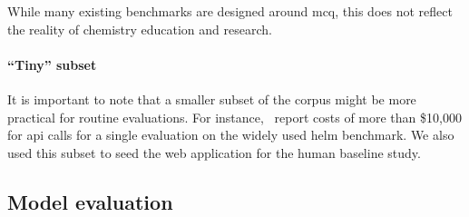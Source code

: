 \documentclass[11pt, oneside]{article}
\begin{document}
\begin{refsection}


While many existing benchmarks are designed around \gls{mcq}, this does not reflect the reality of chemistry education and research.


\paragraph{\enquote{Tiny} subset}
It is important to note that a smaller subset of the corpus might be more practical for routine evaluations.\autocite{polo2024tinybenchmarks}
For instance,~\textcite{liang2023holistic} report costs of more than \$10,000 for \gls{api} calls for a single evaluation on the widely used \gls{helm} benchmark. 
We also used this subset to seed the web application for the human baseline study. 



\subsection{Model evaluation}


\end{refsection}
\end{document}
